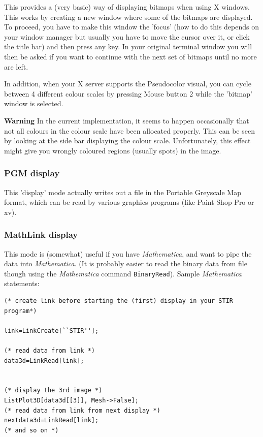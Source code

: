 \documentclass{article}
\begin{document}
{{{{{{This provides a (very basic) way of displaying bitmaps when using 
X windows. This works by creating a new window where some of 
the bitmaps are displayed. To proceed, you have to make this 
window the 'focus' (how to do this depends on your window manager 
but usually you have to move the cursor over it, or click the 
title bar) and then press any key. In your original terminal 
window you will then be asked if you want to continue with the 
next set of bitmaps until no more are left.


In addition, when your X server supports the Pseudocolor visual, 
you can cycle between 4 different colour scales by pressing Mouse 
button 2 while the 'bitmap' window is selected.


\textbf{Warning} In the current implementation, it seems to happen 
occasionally that not all colours in the colour scale have been 
allocated properly. This can be seen by looking at the side bar 
displaying the colour scale. Unfortunately, this effect might 
give you wrongly coloured regions (usually spots) in the image.


\subsubsection{
PGM display}

This 'display' mode actually writes out a file in the Portable 
Greyscale Map format, which can be read by various graphics programs 
(like Paint Shop Pro or xv).


\subsubsection{
MathLink display}

This mode is (somewhat) useful if you have \textit{Mathematica\texttrademark}, 
and want to pipe the data into \textit{Mathematica}. (It is probably 
easier to read the binary data from file though using the \textit{Mathematica} command \texttt{BinaryRead}). 
Sample \textit{Mathematica} statements:

\begin{verbatim}
(* create link before starting the (first) display in your STIR 
program*)

link=LinkCreate[``STIR''];

(* read data from link *)
data3d=LinkRead[link];


(* display the 3rd image *)
ListPlot3D[data3d[[3]], Mesh->False];
(* read data from link from next display *)
nextdata3d=LinkRead[link];
(* and so on *)


\end{verbatim}}}}}}}
\end{document}
